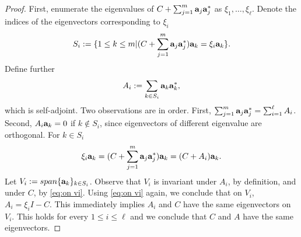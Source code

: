 \documentclass{amsart}
\numberwithin{equation}{section}
\begin{document}
\simdiag
\begin{proof}
  First, enumerate the eigenvalues of $C + \sum_{j=1}^m
  \mathbf{a}_j\mathbf{a}_j^*$ as $\xi_1,\dots,\xi_\ell$. Denote the
  indices of the eigenvectors corresponding to $\xi_i$
  \begin{equation*}
    S_i := \{ 1 \leq k \leq m | (C + \sum_{j=1}^m \mathbf{a}_j\mathbf{a}_j^* )\mathbf{a}_k = \xi_i \mathbf{a}_k \}.
  \end{equation*}
  Define further
  \begin{equation*}
    A_i := \sum_{k \in S_i} \mathbf{a}_k \mathbf{a}_k^*,
  \end{equation*}
  which is self-adjoint. Two observations are in order. First,
  $\sum_{j=1}^m \mathbf{a}_j\mathbf{a}_j^* = \sum_{i=1}^\ell A_i$. Second, $A_i
  \mathbf{a}_k = 0$ if $k\not \in S_i$, since eigenvectors of different
  eigenvalue are orthogonal. For $k \in S_i$
  \begin{equation}\label{eq:on vi}
    \xi_i \mathbf{a}_k = (C + \sum_{j=1}^m \mathbf{a}_j \mathbf{a}_j^* ) \mathbf{a}_k = (C + A_i) \mathbf{a}_k.
  \end{equation}
  Let $V_i := span \{\mathbf{a}_k \}_{k\in S_i}$. Observe that $V_i$ is
  invariant under $A_i$, by definition, and under $C$, by \eqref{eq:on
    vi}. Using \eqref{eq:on vi} again, we conclude that on $V_i$, $A_i
  = \xi_iI - C$. This immediately implies $A_i$ and $C$ have the
  same eigenvectors on $V_i$. This holds for every $1 \leq i \leq
  \ell$ and we conclude that $C$ and $A$ have the same eigenvectors.
\end{proof}
\end{document}
